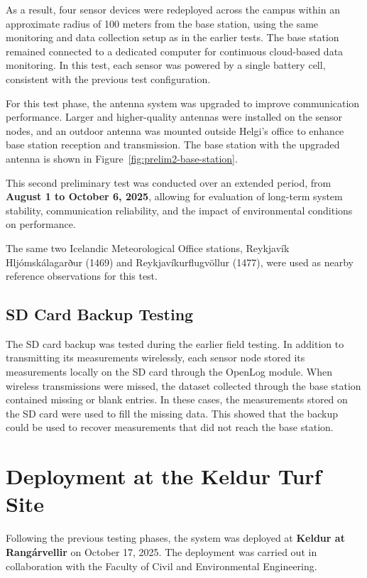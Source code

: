 As a result, four sensor devices were redeployed across the campus
within an approximate radius of 100 meters from the base station, using
the same monitoring and data collection setup as in the earlier tests.
The base station remained connected to a dedicated computer for
continuous cloud-based data monitoring. In this test, each sensor was
powered by a single battery cell, consistent with the previous test
configuration.

For this test phase, the antenna system was upgraded to improve
communication performance. Larger and higher-quality antennas were
installed on the sensor nodes, and an outdoor antenna was mounted
outside Helgi's office to enhance base station reception and
transmission. The base station with the upgraded antenna is shown in Figure~\ref{fig:prelim2-base-station}.

This second preliminary test was conducted over an extended period, from
\textbf{August 1 to October 6, 2025}, allowing for evaluation of
long-term system stability, communication reliability, and the impact of
environmental conditions on performance.

The same two Icelandic Meteorological Office stations, Reykjavík Hljómskálagarður (1469) and Reykjavíkurflugvöllur (1477), were used as nearby reference observations for this test.

\subsection{SD Card Backup Testing}\label{sec:sd-backup-testing}

The SD card backup was tested during the earlier field testing. In addition to transmitting its measurements wirelessly, each sensor node stored its measurements locally on the SD card through the OpenLog module. When wireless transmissions were missed, the dataset collected through the base station contained missing or blank entries. In these cases, the measurements stored on the SD card were used to fill the missing data. This showed that the backup could be used to recover measurements that did not reach the base station.

\section{Deployment at the Keldur Turf Site}\label{sec:keldur-deployment}

Following the previous testing phases, the system was deployed at \textbf{Keldur at Rangárvellir} on October 17, 2025. The deployment was carried out in collaboration with the Faculty of Civil and Environmental Engineering.

